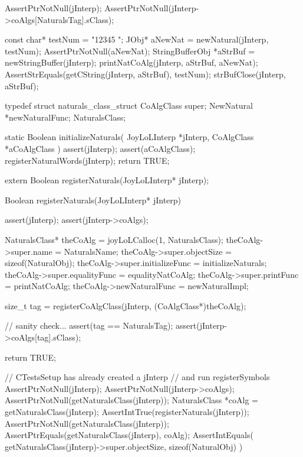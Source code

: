 
\startCTest
  AssertPtrNotNull(jInterp);
  AssertPtrNotNull(jInterp->coAlgs[NaturalsTag].sClass);

  const char* testNum = "12345 ";
  JObj* aNewNat = newNatural(jInterp, testNum);
  AssertPtrNotNull(aNewNat);
  StringBufferObj *aStrBuf = newStringBuffer(jInterp);
  printNatCoAlg(jInterp, aStrBuf, aNewNat);
  AssertStrEquals(getCString(jInterp, aStrBuf), testNum);
  strBufClose(jInterp, aStrBuf);
\stopCTest
\stopTestCase
\stopTestSuite

\startTestSuite[registerSymbols]

\startCHeader
typedef struct naturals_class_struct {
  CoAlgClass super;
  NewNatural *newNaturalFunc;
} NaturalsClass;
\stopCHeader

\startCCode
static Boolean initializeNaturals(
  JoyLoLInterp *jInterp,
  CoAlgClass   *aCoAlgClass
) {
  assert(jInterp);
  assert(aCoAlgClass);
  registerNaturalWords(jInterp);
  return TRUE;
}
\stopCCode

\startCHeader
extern Boolean registerNaturals(JoyLoLInterp* jInterp);
\stopCHeader
{}

\startCCode
Boolean registerNaturals(JoyLoLInterp* jInterp) {
  assert(jInterp);
  assert(jInterp->coAlgs);
  
  NaturalsClass* theCoAlg        = joyLoLCalloc(1, NaturalsClass);
  theCoAlg->super.name           = NaturalsName;
  theCoAlg->super.objectSize     = sizeof(NaturalObj);
  theCoAlg->super.initializeFunc = initializeNaturals;
  theCoAlg->super.equalityFunc   = equalityNatCoAlg;
  theCoAlg->super.printFunc      = printNatCoAlg;
  theCoAlg->newNaturalFunc       = newNaturalImpl;

  size_t tag =
    registerCoAlgClass(jInterp, (CoAlgClass*)theCoAlg);
  
  // sanity check...
  assert(tag == NaturalsTag);
  assert(jInterp->coAlgs[tag].sClass);

  return TRUE;
}
\stopCCode


\startCTest
  // CTestsSetup has already created a jInterp
  // and run registerSymbols
  AssertPtrNotNull(jInterp);
  AssertPtrNotNull(jInterp->coAlgs);
  AssertPtrNotNull(getNaturalsClass(jInterp));
  NaturalsClass *coAlg = getNaturalsClass(jInterp);
  AssertIntTrue(registerNaturals(jInterp));
  AssertPtrNotNull(getNaturalsClass(jInterp));
  AssertPtrEquals(getNaturalsClass(jInterp), coAlg);
  AssertIntEquals(
    getNaturalsClass(jInterp)->super.objectSize,
    sizeof(NaturalObj)
  )
\stopCTest
\stopTestCase
\stopTestSuite
